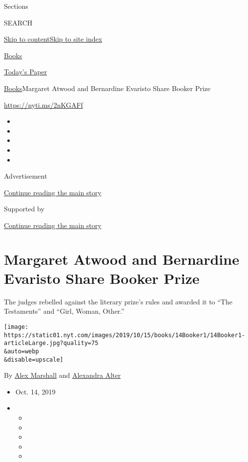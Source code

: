 Sections

SEARCH

\protect\hyperlink{site-content}{Skip to
content}\protect\hyperlink{site-index}{Skip to site index}

\href{https://www.nytimes.com/section/books}{Books}

\href{https://myaccount.nytimes.com/auth/login?response_type=cookie\&client_id=vi}{}

\href{https://www.nytimes.com/section/todayspaper}{Today's Paper}

\href{/section/books}{Books}\textbar{}Margaret Atwood and Bernardine
Evaristo Share Booker Prize

\url{https://nyti.ms/2nKGAFf}

\begin{itemize}
\item
\item
\item
\item
\item
\end{itemize}

Advertisement

\protect\hyperlink{after-top}{Continue reading the main story}

Supported by

\protect\hyperlink{after-sponsor}{Continue reading the main story}

\hypertarget{margaret-atwood-and-bernardine-evaristo-share-booker-prize}{%
\section{Margaret Atwood and Bernardine Evaristo Share Booker
Prize}\label{margaret-atwood-and-bernardine-evaristo-share-booker-prize}}

The judges rebelled against the literary prize's rules and awarded it to
``The Testaments'' and ``Girl, Woman, Other.''

\texttt{[image: https://static01.nyt.com/images/2019/10/15/books/14Booker1/14Booker1-articleLarge.jpg?quality=75\\\&auto=webp\\\&disable=upscale]}

By \href{https://www.nytimes.com/by/alex-marshall}{Alex Marshall} and
\href{https://www.nytimes.com/by/alexandra-alter}{Alexandra Alter}

\begin{itemize}
\item
  Oct. 14, 2019
\item
  \begin{itemize}
  \item
  \item
  \item
  \item
  \item
  \end{itemize}
\end{itemize}

